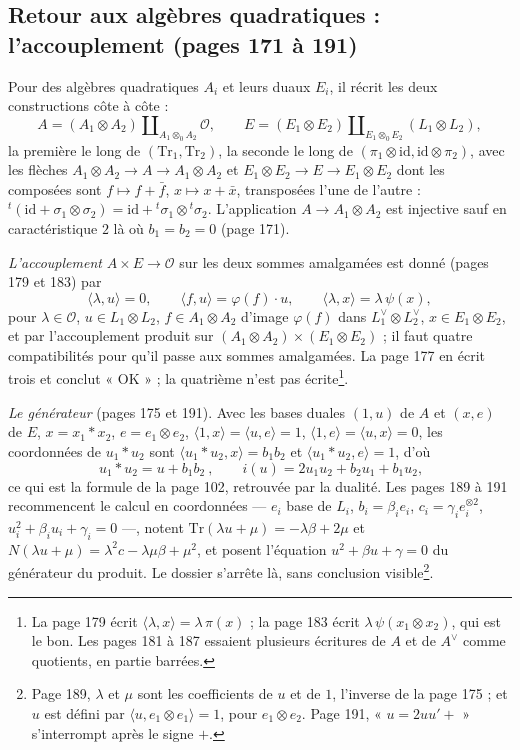 \documentclass[11pt,a4paper]{article}
\begin{document}
\subsection*{Retour aux algèbres quadratiques : l'accouplement (pages 171 à 191)}

Pour des algèbres quadratiques $A_i$ et leurs duaux $E_i$, il récrit les deux
constructions côte à côte :
\[
  A = (A_1 \otimes A_2) \amalg_{A_1 \otimes_0 A_2} \mathcal{O}, \qquad
  E = (E_1 \otimes E_2) \amalg_{E_1 \otimes_0 E_2} (L_1 \otimes L_2),
\]
la première le long de $(\mathrm{Tr}_1, \mathrm{Tr}_2)$, la seconde le long de
$(\pi_1 \otimes \mathrm{id}, \mathrm{id} \otimes \pi_2)$, avec les flèches $A_1 \otimes A_2 \to A
\to A_1 \otimes A_2$ et $E_1 \otimes E_2 \to E \to E_1 \otimes E_2$ dont les composées sont
$f \mapsto f + \bar{f}$, $x \mapsto x + \bar{x}$, transposées l'une de l'autre :
${}^{t}(\mathrm{id} + \sigma_1 \otimes \sigma_2) = \mathrm{id} + {}^{t}\sigma_1 \otimes {}^{t}\sigma_2$.
L'application $A \to A_1 \otimes A_2$ est injective sauf en caractéristique $2$ là où
$b_1 = b_2 = 0$ (page 171).

\emph{L'accouplement} $A \times E \to \mathcal{O}$ sur les deux sommes amalgamées est
donné (pages 179 et 183) par
\[
  \langle\lambda, u\rangle = 0, \qquad \langle f, u\rangle = \varphi(f)\cdot u, \qquad
  \langle\lambda, x\rangle = \lambda\,\psi(x),
\]
pour $\lambda \in \mathcal{O}$, $u \in L_1 \otimes L_2$, $f \in A_1 \otimes A_2$ d'image $\varphi(f)$
dans $L_1^{\vee} \otimes L_2^{\vee}$, $x \in E_1 \otimes E_2$, et par l'accouplement produit
sur $(A_1 \otimes A_2) \times (E_1 \otimes E_2)$ ; il faut quatre compatibilités pour qu'il
passe aux sommes amalgamées. La page 177 en écrit trois et conclut « OK » ; la
quatrième n'est pas écrite\footnote{La page 179 écrit $\langle\lambda, x\rangle =
\lambda\,\pi(x)$ ; la page 183 écrit $\lambda\,\psi(x_1 \otimes x_2)$, qui est le bon. Les
pages 181 à 187 essaient plusieurs écritures de $A$ et de $A^{\vee}$ comme
quotients, en partie barrées.}.

\emph{Le générateur} (pages 175 et 191). Avec les bases duales $(1, u)$ de $A$ et
$(x, e)$ de $E$, $x = x_1 * x_2$, $e = e_1 \otimes e_2$, $\langle 1, x\rangle = \langle u,
e\rangle = 1$, $\langle 1, e\rangle = \langle u, x\rangle = 0$, les coordonnées de
$u_1 * u_2$ sont $\langle u_1 * u_2, x\rangle = b_1b_2$ et $\langle u_1 * u_2, e\rangle = 1$,
d'où
\[
  \boxed{\ u_1 * u_2 = u + b_1b_2\ }, \qquad i(u) = 2u_1u_2 + b_2u_1 + b_1u_2 ,
\]
ce qui est la formule de la page 102, retrouvée par la dualité. Les pages 189 à 191
recommencent le calcul en coordonnées --- $e_i$ base de $L_i$, $b_i = \beta_ie_i$,
$c_i = \gamma_ie_i^{\otimes 2}$, $u_i^{2} + \beta_iu_i + \gamma_i = 0$ ---, notent $\mathrm{Tr}(\lambda u
+ \mu) = -\lambda\beta + 2\mu$ et $N(\lambda u + \mu) = \lambda^{2}c - \lambda\mu\beta + \mu^{2}$, et
posent l'équation $u^{2} + \beta u + \gamma = 0$ du générateur du produit. Le dossier
s'arrête là, sans conclusion visible\footnote{Page 189, $\lambda$ et $\mu$ sont les
coefficients de $u$ et de $1$, l'inverse de la page 175 ; et $u$ est défini par
$\langle u, e_1 \otimes e_1\rangle = 1$, pour $e_1 \otimes e_2$. Page 191, « $u = 2uu' +$ »
s'interrompt après le signe $+$.}.
\end{document}
